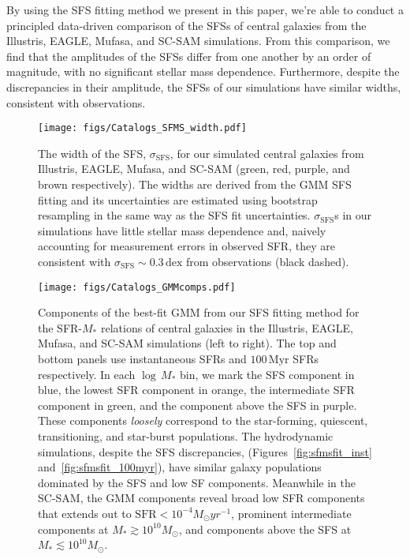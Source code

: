\documentclass[preprint2,tighten]{aastex62}
\begin{document}
By using the SFS fitting method we present in this paper, we're able to 
conduct a principled data-driven comparison of the SFSs of central galaxies 
from the Illustris, EAGLE, {\sc Mufasa}, and SC-SAM simulations. From 
this comparison, we find that the amplitudes of the SFSs differ from one 
another by an order of magnitude, with no significant stellar mass dependence. 
Furthermore, despite the discrepancies in their amplitude, the SFSs of 
our simulations have similar widths, consistent with observations. 
\begin{figure}
\begin{center}
\texttt{[image: figs/Catalogs\_SFMS\_width.pdf]}
\caption{The width of the SFS, $\sigma_\mathrm{SFS}$, for our simulated 
    central galaxies from Illustris, EAGLE, {\sc Mufasa}, and SC-SAM 
    (green, red, purple, and brown respectively). The widths are derived from  
    the GMM SFS fitting and its uncertainties are estimated using bootstrap
    resampling in the same way as the SFS fit uncertainties. 
    $\sigma_\mathrm{SFS}$s in our simulations have little stellar mass 
    dependence and, naively accounting for measurement errors in observed 
    SFR, they are consistent with $\sigma_\mathrm{SFS}{\sim}0.3\,\mathrm{dex}$ 
    from observations (black dashed).} \label{fig:sfms_width}
\end{center}
\end{figure}

\begin{figure*}
\begin{center}
\texttt{[image: figs/Catalogs\_GMMcomps.pdf]} 
\caption{Components of the best-fit GMM from our SFS fitting method for the
    SFR-$M_*$ relations of central galaxies in the Illustris, EAGLE, {\sc Mufasa}, and 
    SC-SAM simulations (left to right). The top and bottom panels use instantaneous 
    SFRs and $100\,\mathrm{Myr}$ SFRs respectively. In each $\log\,M_*$ bin, we mark 
    the SFS component in blue, the lowest SFR component in orange, the intermediate 
    SFR component in green, and the component above the SFS in purple. These components 
    \emph{loosely} correspond to the star-forming, quiescent, transitioning, and 
    star-burst populations. The hydrodynamic simulations, despite the SFS discrepancies,
    (Figures~\ref{fig:sfmsfit_inst} and~\ref{fig:sfmsfit_100myr}), have similar 
    galaxy populations dominated by the SFS and low SF components. Meanwhile in the 
    SC-SAM, the GMM components reveal broad low SFR components that extends out to 
    $\mathrm{SFR} < 10^{-4}M_\odot yr^{-1}$, prominent intermediate components at 
    $M_* \gtrsim 10^{10}M_\odot$, and components above the SFS at $M_* \lesssim 10^{10}M_\odot$.} \label{fig:sfmsfit_comps}
\end{center}
\end{figure*}
\end{document}

